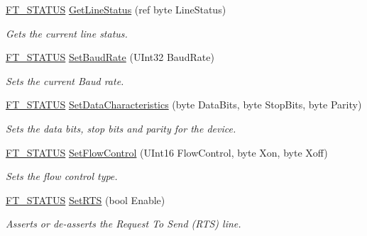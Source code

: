 \begin{DoxyCompactItemize}
\mbox{\hyperlink{class_f_t_d2_x_x___n_e_t_1_1_f_t_d_i_aabe20ad905cc4ccc1e35dd5b877d9a83}{F\+T\+\_\+\+S\+T\+A\+T\+US}} \mbox{\hyperlink{class_f_t_d2_x_x___n_e_t_1_1_f_t_d_i_aa1832f81a5087fbf4fd3b1d02cd80509}{Get\+Line\+Status}} (ref byte Line\+Status)
\begin{DoxyCompactList}\small\item\em Gets the current line status. \end{DoxyCompactList}\item 
\mbox{\hyperlink{class_f_t_d2_x_x___n_e_t_1_1_f_t_d_i_aabe20ad905cc4ccc1e35dd5b877d9a83}{F\+T\+\_\+\+S\+T\+A\+T\+US}} \mbox{\hyperlink{class_f_t_d2_x_x___n_e_t_1_1_f_t_d_i_a8e67f80eaaa6a0904af25d2d8b312fbc}{Set\+Baud\+Rate}} (U\+Int32 Baud\+Rate)
\begin{DoxyCompactList}\small\item\em Sets the current Baud rate. \end{DoxyCompactList}\item 
\mbox{\hyperlink{class_f_t_d2_x_x___n_e_t_1_1_f_t_d_i_aabe20ad905cc4ccc1e35dd5b877d9a83}{F\+T\+\_\+\+S\+T\+A\+T\+US}} \mbox{\hyperlink{class_f_t_d2_x_x___n_e_t_1_1_f_t_d_i_ac5f2001f1839dc3617b7e287270d8f97}{Set\+Data\+Characteristics}} (byte Data\+Bits, byte Stop\+Bits, byte Parity)
\begin{DoxyCompactList}\small\item\em Sets the data bits, stop bits and parity for the device. \end{DoxyCompactList}\item 
\mbox{\hyperlink{class_f_t_d2_x_x___n_e_t_1_1_f_t_d_i_aabe20ad905cc4ccc1e35dd5b877d9a83}{F\+T\+\_\+\+S\+T\+A\+T\+US}} \mbox{\hyperlink{class_f_t_d2_x_x___n_e_t_1_1_f_t_d_i_ad7f6e8173e6abde2dc3b839e1ce7d67c}{Set\+Flow\+Control}} (U\+Int16 Flow\+Control, byte Xon, byte Xoff)
\begin{DoxyCompactList}\small\item\em Sets the flow control type. \end{DoxyCompactList}\item 
\mbox{\hyperlink{class_f_t_d2_x_x___n_e_t_1_1_f_t_d_i_aabe20ad905cc4ccc1e35dd5b877d9a83}{F\+T\+\_\+\+S\+T\+A\+T\+US}} \mbox{\hyperlink{class_f_t_d2_x_x___n_e_t_1_1_f_t_d_i_a01e338c929efac4f87154be24fe71ae2}{Set\+R\+TS}} (bool Enable)
\begin{DoxyCompactList}\small\item\em Asserts or de-\/asserts the Request To Send (R\+TS) line. \end{DoxyCompactList}\item 

\end{DoxyCompactItemize}
